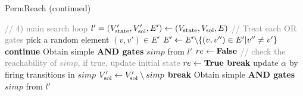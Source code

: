 \clearpage

\begin{algorithm}
\caption{PermReach (continued)}
\begin{algorithmic}
    \State \textcolor{gray}{// 4) main search loop} %
        \State $l'=(V'_{\mathrm{state}}, V'_{\mathrm{sol}},E')\gets(V_{\mathrm{state}}, V_{\mathrm{sol}},E)$
         \textcolor{gray}{// Treat each OR gates}
            \State pick a random element $(v,v') \in E'$
            \State $E'\gets E' \miset{(v,v'') \in E'| v''\neq v'}$
        \EndFor
            \State \textbf{continue}
        \EndIf
        \State Obtain simple \textbf{AND gates} $simp$ from $l'$
            \State $re\gets\mathbf{False}$ 
            \State\textcolor{gray}{// check the reachability of $simp$, if true, update initial state}
                    \State $re\gets\mathbf{True}$
                    \State \textbf{break}
                \EndIf
            \EndFor
                \State update $\alpha$ by firing transitions in $simp$
                \State $V'_{\mathrm{sol}}\gets V'_{\mathrm{sol}} \setminus simp$
            \Else
                \State \textbf{break}
            \EndIf
            \State Obtain simple \textbf{AND gates} $simp$ from $l'$
        \EndWhile
            \State\Return{$\true$}
        \EndIf
    \EndFor %
    \State {}
\end{algorithmic}
\end{algorithm}

